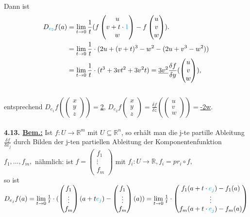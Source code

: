 \documentclass[]{scrartcl}
\begin{document}
Dann ist \begin{align}
	D_{\textcolor{cyan}{e_2}} f(a)&= \lim\limits_{t\rightarrow 
	0}\frac{1}{t}(f\begin{pmatrix}
		u\\v+t\cdot\textcolor{cyan}{1}\\w
	\end{pmatrix}-f\begin{pmatrix}
	u\\v\\w
\end{pmatrix}).\\
&=\lim\limits_{t\rightarrow0}\frac{1}{t}\cdot(2u+(v+t)^3-w^2-(2u+v^3-w^2))\\
&=\lim\limits_{t\rightarrow 
0}\frac{1}{t}\cdot(t^3+3vt^2+3v^2t)=\underline{3v^2}\frac{\delta f}{\delta 
y}(\begin{pmatrix}
	u\\v\\w
\end{pmatrix}),
\end{align}\\
entsprechend $D_{e_1}f(\begin{pmatrix}
	x\\y\\z
\end{pmatrix})=$\underline{2}, $D_{e_2}f\begin{pmatrix}
	x\\y\\z
\end{pmatrix}=\frac{\delta f}{\delta z}(\begin{pmatrix}
	u\\v\\w
\end{pmatrix})=$\underline{-2w}.\\
\\
\textbf{4.13. \underline{Bem.:}} Ist $f: U\rightarrow \mathbb{R}^m$ mit 
$U\subseteq \mathbb{R}^n$, so erhält man die j-te partille Ableitung 
$\frac{\delta f}{\delta x_j}$ durch Bilden der j-ten partiellen Ableitung der 
Komponentenfunktion $f_1,...,f_m,$ nähmlich: ist $f=\begin{pmatrix}
	f_1\\\vdots\\f_m
\end{pmatrix}$ mit $f_i : U\rightarrow\mathbb{R}, f_i=pr_i \circ f,$\\
so ist $D_{e_j} f(a)=\lim\limits_{t\rightarrow 
0}\frac{1}{t}\cdot(\begin{pmatrix}
	f_1\\\vdots\\f_m
\end{pmatrix}(a+t\textcolor{cyan}{e_j})-\begin{pmatrix}
	f_1\\\vdots\\f_m
\end{pmatrix}(a))=\lim\limits_{t\rightarrow0}\frac{1}{t}\cdot\begin{pmatrix}
	f_1(a+t\cdot\textcolor{cyan}{e_j})-f_1(a)\\\vdots\\f_m(a+t\cdot\textcolor{cyan}{e_j})-f_m(a)
\end{pmatrix}$\\
\end{document}
